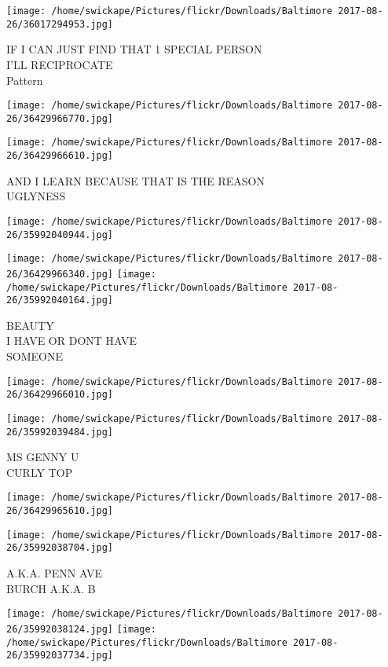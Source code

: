 \documentclass[10pt,letterpaper]{article}
\begin{document}
\texttt{[image: /home/swickape/Pictures/flickr/Downloads/Baltimore 2017-08-26/36017294953.jpg]}

IF I CAN JUST FIND THAT 1 SPECIAL PERSON\\
I'LL RECIPROCATE\\
Pattern
\pagebreak

\texttt{[image: /home/swickape/Pictures/flickr/Downloads/Baltimore 2017-08-26/36429966770.jpg]}

\vspace{0.25in}
\texttt{[image: /home/swickape/Pictures/flickr/Downloads/Baltimore 2017-08-26/36429966610.jpg]}

AND I LEARN BECAUSE THAT IS THE REASON\\
UGLYNESS
\pagebreak

\texttt{[image: /home/swickape/Pictures/flickr/Downloads/Baltimore 2017-08-26/35992040944.jpg]}

\vspace{0.25in}
\texttt{[image: /home/swickape/Pictures/flickr/Downloads/Baltimore 2017-08-26/36429966340.jpg]}
\texttt{[image: /home/swickape/Pictures/flickr/Downloads/Baltimore 2017-08-26/35992040164.jpg]}

BEAUTY\\
I HAVE OR DONT HAVE\\
SOMEONE
\pagebreak

\texttt{[image: /home/swickape/Pictures/flickr/Downloads/Baltimore 2017-08-26/36429966010.jpg]}

\vspace{0.25in}
\texttt{[image: /home/swickape/Pictures/flickr/Downloads/Baltimore 2017-08-26/35992039484.jpg]}

MS GENNY U\\
CURLY TOP
\pagebreak

\texttt{[image: /home/swickape/Pictures/flickr/Downloads/Baltimore 2017-08-26/36429965610.jpg]}

\vspace{0.25in}
\texttt{[image: /home/swickape/Pictures/flickr/Downloads/Baltimore 2017-08-26/35992038704.jpg]}

A.K.A. PENN AVE\\
BURCH A.K.A. B
\pagebreak

\texttt{[image: /home/swickape/Pictures/flickr/Downloads/Baltimore 2017-08-26/35992038124.jpg]}
\texttt{[image: /home/swickape/Pictures/flickr/Downloads/Baltimore 2017-08-26/35992037734.jpg]}
\end{document}
